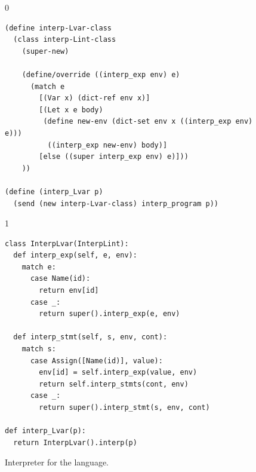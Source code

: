 \documentclass[7x10]{TimesAPriori_MIT}%
\def\racketEd{0}
\def\pythonEd{1}
\def\edition{1}
\newcommand{\pythonColor}[0]{}
\numberwithin{theorem}{chapter}
\numberwithin{definition}{chapter}
\numberwithin{equation}{chapter}
\begin{document}
\begin{figure}[tp]
\begin{tcolorbox}[colback=white]
{\if\edition\racketEd
\begin{lstlisting}
(define interp-Lvar-class
  (class interp-Lint-class
    (super-new)
    
    (define/override ((interp_exp env) e)
      (match e
        [(Var x) (dict-ref env x)]
        [(Let x e body)
         (define new-env (dict-set env x ((interp_exp env) e)))
          ((interp_exp new-env) body)]
        [else ((super interp_exp env) e)]))
    ))

(define (interp_Lvar p)
  (send (new interp-Lvar-class) interp_program p))
\end{lstlisting}
\fi}
{\if\edition\pythonEd\pythonColor
\begin{lstlisting}
class InterpLvar(InterpLint):
  def interp_exp(self, e, env):
    match e:
      case Name(id):
        return env[id]
      case _:
        return super().interp_exp(e, env)

  def interp_stmt(self, s, env, cont):
    match s:
      case Assign([Name(id)], value):
        env[id] = self.interp_exp(value, env)
        return self.interp_stmts(cont, env)
      case _:
        return super().interp_stmt(s, env, cont)

def interp_Lvar(p):
  return InterpLvar().interp(p)
\end{lstlisting}
\fi}
\end{tcolorbox}
\caption{Interpreter for the \LangVar{} language.}
\label{fig:interp-Lvar}
\end{figure}
\end{document}

